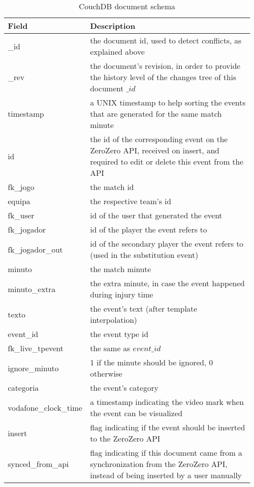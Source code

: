 \begin{table}
    \centering
    \caption{CouchDB document schema}
    \begin{tabularx}{\textwidth}{|l|X|}
        \hline
        \textbf{Field}        & \textbf{Description} \\ \hline \hline
        \_id & the document id, used to detect conflicts, as explained above \\ \hline
        \_rev & the document's revision, in order to provide the history level of the changes tree of this document $\_id$ \\ \hline
        timestamp & a UNIX timestamp to help sorting the events that are generated for the same match minute \\ \hline
        id & the id of the corresponding event on the ZeroZero API, received on insert, and required to edit or delete this event from the API \\ \hline
        fk\_jogo & the match id \\ \hline
        equipa & the respective team's id \\ \hline
        fk\_user & id of the user that generated the event     \\ \hline
        fk\_jogador & id of the player the event refers to     \\ \hline
        fk\_jogador\_out & id of the secondary player the event refers to (used in the substitution event)     \\ \hline
        minuto & the match minute \\ \hline
        minuto\_extra & the extra minute, in case the event happened during injury time \\ \hline
        texto & the event's text (after template interpolation) \\ \hline
        event\_id & the event type id     \\ \hline
        fk\_live\_tpevent & the same as $event\_id$ \\ \hline
        ignore\_minuto & 1 if the minute should be ignored, 0 otherwise \\ \hline
        categoria & the event's category   \\ \hline
        vodafone\_clock\_time & a timestamp indicating the video mark when the event can be visualized \\ \hline
        insert & flag indicating if the event should be inserted to the ZeroZero\hyphenation{ZeroZero} API \\ \hline
        synced\_from\_api & flag indicating if this document came from a synchronization from the ZeroZero API, instead of being inserted by a user manually  \\ \hline
    \end{tabularx}
    \label{table:document-schema}
\end{table}

